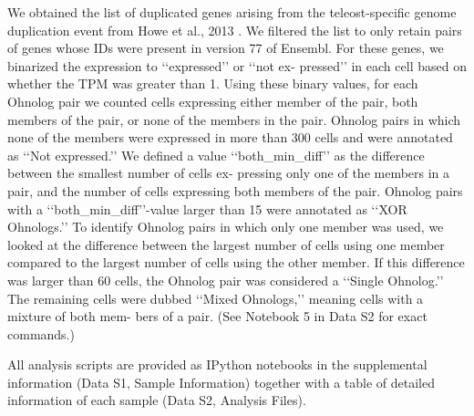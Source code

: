 We obtained the list of duplicated genes arising from the teleost-specific genome duplication event from Howe et al., 2013  \cite{Howe2013-ul}. We filtered the list to only retain pairs of genes whose IDs were present in version 77 of Ensembl. For these genes, we binarized the expression to ‘‘expressed’’ or ‘‘not ex- pressed’’ in each cell based on whether the TPM was greater than 1. Using these binary values, for each Ohnolog pair we counted cells expressing either member of the pair, both members of the pair, or none of the members in the pair. Ohnolog pairs in which none of the members were expressed in more than 300 cells and were annotated as ‘‘Not expressed.’’ We defined a value ‘‘both\_min\_diff’’ as the difference between the smallest number of cells ex- pressing only one of the members in a pair, and the number of cells expressing both members of the pair. Ohnolog pairs with a ‘‘both\_min\_diff’’-value larger than 15 were annotated as ‘‘XOR Ohnologs.’’ To identify Ohnolog pairs in which only one member was used, we looked at the difference between the largest number of cells using one member compared to the largest number of cells using the other member. If this difference was larger than 60 cells, the Ohnolog pair was considered a ‘‘Single Ohnolog.’’ The remaining cells were dubbed ‘‘Mixed Ohnologs,’’ meaning cells with a mixture of both mem- bers of a pair. (See Notebook 5 in Data S2 for exact commands.)

All analysis scripts are provided as IPython notebooks in the supplemental information (Data S1, Sample Information) together with a table of detailed information of each sample (Data S2, Analysis Files).

